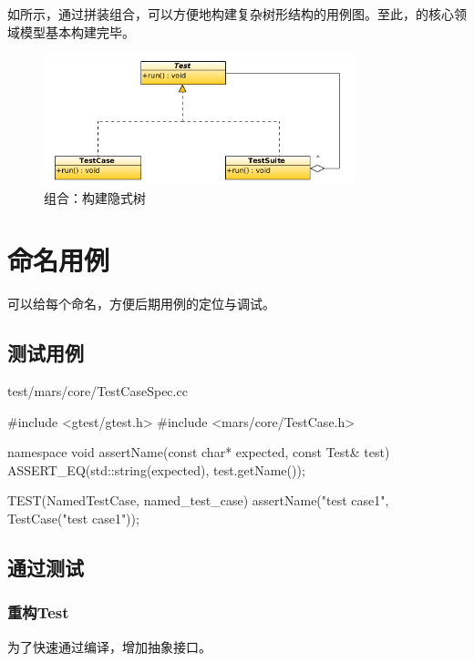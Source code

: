 \begin{content}
如所示，通过拼装组合，可以方便地构建复杂树形结构的用例图。至此，的核心领域模型基本构建完毕。

\begin{figure}
\centering
\includegraphics[width=0.8\textwidth]{figures/xunit/test-tree.png}
\caption{组合：构建隐式树}
 \label{fig:test-tree}
\end{figure}

\section{命名用例}

可以给每个命名，方便后期用例的定位与调试。

\subsection{测试用例}

\begin{nodiff}{test/mars/core/TestCaseSpec.cc}
 \begin{c++}
#include <gtest/gtest.h>
#include <mars/core/TestCase.h>

namespace {
  void assertName(const char* expected, const Test& test) {
    ASSERT_EQ(std::string(expected), test.getName());
  }
}

TEST(NamedTestCase, named_test_case) {
  assertName("test case1", TestCase("test case1"));
}
 \end{c++}
\end{nodiff}

\subsection{通过测试}

\subsubsection{重构Test}

为了快速通过编译，增加抽象接口。


\end{content}
